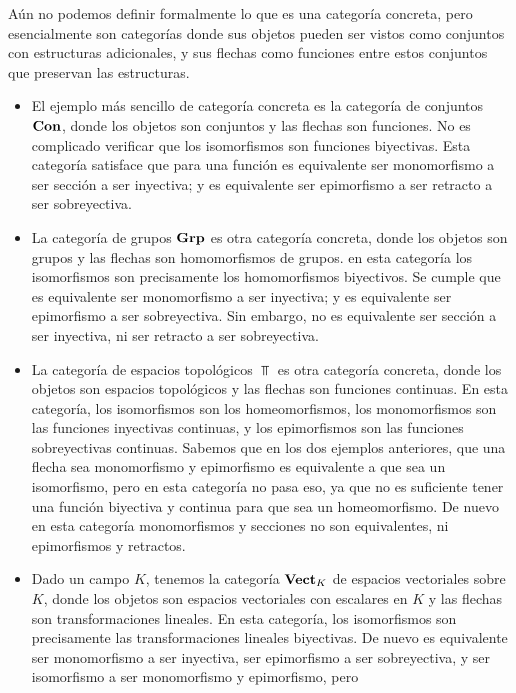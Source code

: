 \documentclass{comunicaciones}
\begin{document}
\begin{ej}\label{Categorías concretas}
    Aún no podemos definir formalmente lo que es una categoría concreta, pero esencialmente son categorías donde sus objetos pueden ser vistos como conjuntos
    con estructuras adicionales, y sus flechas como funciones entre estos conjuntos que preservan las estructuras.
    \begin{itemize}
        \item El ejemplo más sencillo de categoría concreta es la categoría de conjuntos $\mathbf{Con}$, donde los objetos son conjuntos y las flechas son funciones.
        No es complicado verificar que los isomorfismos son funciones biyectivas. Esta categoría satisface que para una función es equivalente ser monomorfismo a
        ser sección a ser inyectiva; y es equivalente ser epimorfismo a ser retracto a ser sobreyectiva.
        \item La categoría de grupos $\mathbf{Grp}$ es otra categoría concreta, donde los objetos son grupos y las flechas son homomorfismos de grupos. en esta categoría
        los isomorfismos son precisamente los homomorfismos biyectivos. Se cumple que es equivalente ser monomorfismo a ser inyectiva; y es equivalente ser
        epimorfismo a ser sobreyectiva. Sin embargo, no es equivalente ser sección a ser inyectiva, ni ser retracto a ser sobreyectiva.
        \item La categoría de espacios topológicos $\Top$ es otra categoría concreta, donde los objetos son espacios topológicos y las flechas son funciones
        continuas. En esta categoría, los isomorfismos son los homeomorfismos, los monomorfismos son las funciones inyectivas continuas, y los epimorfismos
        son las funciones sobreyectivas continuas. Sabemos que en los dos ejemplos anteriores, que una flecha sea monomorfismo y epimorfismo es equivalente
        a que sea un isomorfismo, pero en esta categoría no pasa eso, ya que no es suficiente tener una función biyectiva y continua para que sea un 
        homeomorfismo. De nuevo en esta categoría monomorfismos y secciones no son equivalentes, ni epimorfismos y retractos. 
        \item Dado un campo $K$, tenemos la categoría $\mathbf{Vect}_K$ de espacios vectoriales sobre $K$, donde los objetos son espacios vectoriales con escalares
        en $K$ y las flechas son transformaciones lineales. En esta categoría, los isomorfismos son precisamente las transformaciones lineales biyectivas. 
        De nuevo es equivalente ser monomorfismo a ser inyectiva, ser epimorfismo a ser sobreyectiva, y ser isomorfismo a ser monomorfismo y epimorfismo, pero

\end{itemize}
\end{ej}
\end{document}
